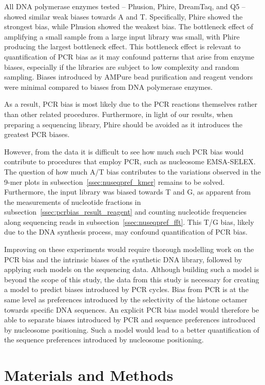 \documentclass[a4paper, numbers=noenddot]{scrbook}
\begin{document}
All DNA polymerase enzymes tested -- Phusion, Phire, DreamTaq, and Q5  -- showed similar weak biases towards A and T.  Specifically, Phire showed the strongest bias, while Phusion showed the weakest bias.  The bottleneck effect of amplifying a small sample from a large input library was small, with Phire producing the largest bottleneck effect.  This bottleneck effect is relevant to quantification of PCR bias as it may confound patterns that arise from enzyme biases, especially if the libraries are subject to low complexity and random sampling.  Biases introduced by AMPure bead purification and reagent vendors were minimal compared to biases from DNA polymerase enzymes.

As a result, PCR bias is most likely due to the PCR reactions themselves rather than other related procedures.  Furthermore, in light of our results, when preparing a sequencing library, Phire should be avoided as it introduces the greatest PCR biases.

However, from the data it is difficult to see how much such PCR bias would contribute to procedures that employ PCR, such as nucleosome EMSA-SELEX.  The question of how much A/T bias contributes to the variations observed in the 9-mer plots in subsection~\ref{ssec:nuseqpref_kmer} remains to be solved.  Furthermore, the input library was biased towards T and G, as apparent from the measurements of nucleotide fractions in subsection~\ref{ssec:pcrbias_result_reagent} and counting nucleotide frequencies along sequencing reads in subsection~\ref{ssec:nuseqpref_fft}.  This T/G bias, likely due to the DNA synthesis process, may confound quantification of PCR bias.

Improving on these experiments would require thorough modelling work on the PCR bias and the intrinsic biases of the synthetic DNA library, followed by applying such models on the sequencing data.  Although building such a model is beyond the scope of this study, the data from this study is necessary for creating a model to predict biases introduced by PCR cycles.  Bias from PCR is at the same level as preferences introduced by the selectivity of the histone octamer towards specific DNA sequences.  An explicit PCR bias model would therefore be able to separate biases introduced by PCR and sequence preferences introduced by nucleosome positioning.  Such a model would lead to a better quantification of the sequence preferences introduced by nucleosome positioning.

\section{Materials and Methods}
\label{sec:pcrbias_methods}
\end{document}
